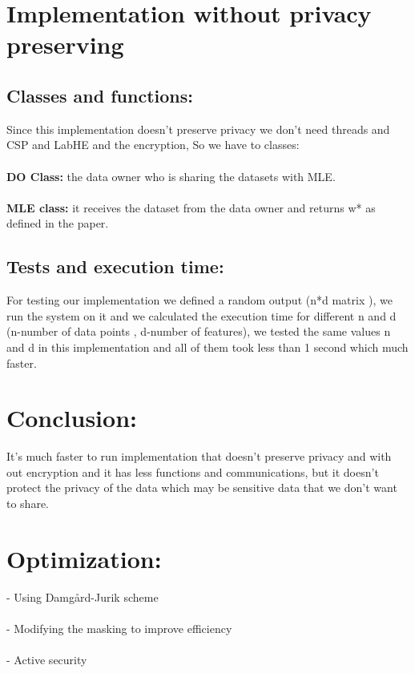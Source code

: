 \documentclass[12pt]{article}
\begin{document}
\section{Implementation without privacy preserving} 
\subsection{Classes and functions:}
Since this implementation doesn't preserve privacy we don't need threads and CSP and LabHE and the encryption, So we have to classes:
\\ \\ \textbf{DO Class:} the data owner who is sharing the datasets with MLE.
\\ \\ \textbf{MLE class:} it receives the dataset from the data owner and returns w* as defined in the paper.
\subsection{Tests and execution time:}
For testing our implementation we defined a random output (n*d matrix ), we run the system on it and we calculated the execution time for different n and d (n-number of data points , d-number of features), we tested the same values n and d in this implementation and all of them took less than 1 second which much faster.
\section{Conclusion:}
It's much faster to run implementation that doesn't preserve privacy and with out encryption and it has less functions and communications, but it doesn't protect the privacy of the data which may be sensitive data that we don't want to share.
\section{Optimization:}
- Using Damgård-Jurik scheme \\ \\
- Modifying the masking to improve efficiency\\ \\ 
- Active security\\ \\
\end{document}
